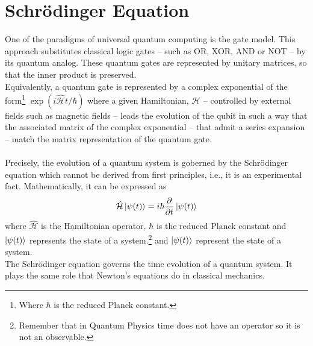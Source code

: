 \section{Schrödinger Equation}
One of the paradigms of universal quantum computing is the gate model. This approach substitutes classical logic gates -- such as OR, XOR, AND or NOT -- by its quantum analog. These quantum gates are represented by unitary matrices, so that the inner product is preserved.\\
Equivalently, a quantum gate is represented by a complex exponential of the form\footnote{Where $\hbar$ is the reduced Planck constant.} $\exp\left(i\hat{\mathcal{H}}t / \hbar\right)$ where a given Hamiltonian, $\mathcal{H}$ -- controlled by external fields such as magnetic fields -- leads the evolution of the qubit in such a way that the associated matrix of the complex exponential -- that admit a series expansion -- match the matrix representation of the quantum gate. \\\\
Precisely, the evolution of a quantum system is goberned by the Schrödinger equation which cannot be derived from first principles, i.e., it is an experimental fact. Mathematically, it can be expressed as
\begin{equation}
    \hat{\mathcal{H}}\ket{\psi(t)} = i\hbar \frac{\partial}{\partial t}\ket{\psi(t)}
\end{equation}
where $\hat{\mathcal{H}}$ is the Hamiltonian operator, $\hbar$ is the reduced Planck constant and $\ket{\psi(t)}$ represents the state of a system.\footnote{Remember that in Quantum Physics time does not have an operator so it is not an observable.} and $\ket{\psi(t)}$ represent the state of a system.\\
The Schrödinger equation governs the time evolution of a quantum system. It plays the same role that Newton's equations do in classical mechanics.
